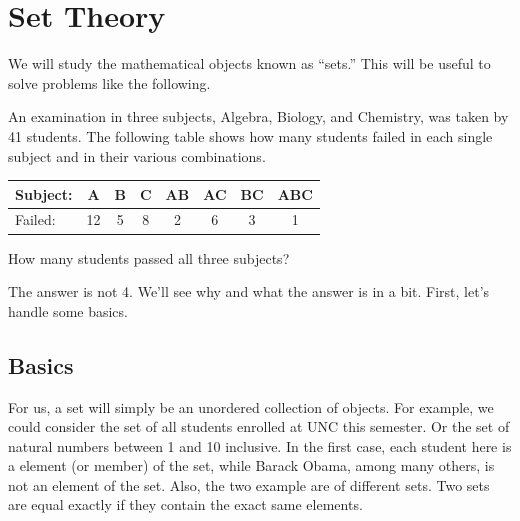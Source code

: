 

\section{Set Theory}

We will study the mathematical objects known as ``sets.''  This will be useful to solve problems like the following.

\begin{problem}
An examination in three subjects, Algebra, Biology, and Chemistry, was taken
by 41 students. The following table shows how many students failed in each
single subject and in their various combinations.
\begin{center}
\begin{tabular}{|l|c|c|c|c|c|c|c|}
\hline
 Subject: & A & B & C & AB & AC & BC & ABC\\
\hline
Failed: & 12 & 5 & 8 & 2 & 6 & 3 & 1\\
\hline
\end{tabular}
\end{center}

How many students passed all three subjects?
\end{problem}

The answer is not 4.  We'll see why and what the answer is in a bit.  First, let's handle some basics.

\subsection*{Basics}

For us, a set will simply be an unordered collection of objects.  For example, we could consider the set of all students enrolled at UNC this semester.  Or the set of natural numbers between 1 and 10 inclusive.  In the first case, each student here is a element (or member) of the set, while Barack Obama, among many others, is not an element of the set.  Also, the two example are of different sets.  Two sets are equal exactly if they contain the exact same elements.

